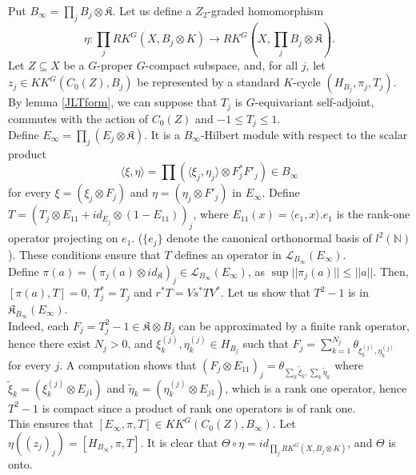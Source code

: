 \begin{dem}
Put $B_\infty = \prod_j B_j\otimes \mathfrak K $. Let us define a $Z_2$-graded homomorphism 
\[\eta :  \prod_j RK^G(X,B_j\otimes K) \rightarrow RK^G(X,\prod_j B_j\otimes \mathfrak K).\] 
Let $Z\subseteq X$ be a $G$-proper $G$-compact subspace, and, for all $j$, let $z_j\in KK^G(C_0(Z),B_j)$ be represented by a standard $K$-cycle $(H_{B_j},\pi_j ,T_j)$. By lemma \ref{JLTform}, we can suppose that $T_j$ is $G$-equivariant self-adjoint, commutes with the action of $C_0(Z)$ and $-1\leq T_j \leq 1$. \\

Define $E_\infty = \prod_j (E_j\otimes \mathfrak K)$. It is a $B_\infty$-Hilbert module with respect to the scalar product 
\[\langle \xi,\eta\rangle = \prod (\langle \xi_j,\eta_j\rangle \otimes F_j^* F'_j )\in B_\infty\] 
for every $\xi = (\xi_j\otimes F_j)$ and $\eta = (\eta_j\otimes F'_j)$ in $E_\infty$. Define $T = (T_j\otimes E_{11} + id_{E_j}\otimes (1-E_{11}))_j$, where $E_{11}(x)= \langle e_1,x\rangle. e_1$ is the rank-one operator projecting on $e_1$. ($\{e_j\}$ denote the canonical orthonormal basis of $l^2(\mathbb N)$).
These conditions ensure that $T $ defines an operator in $\mathcal L_{B_\infty}(E_\infty)$.\\

Define $\pi(a) = (\pi_j(a)\otimes id_{\mathfrak K})_j\in  \mathcal L_{B_\infty}(E_\infty)$, as $\sup ||\pi_j(a)||\leq ||a||$. Then, $[\pi(a),T]=0$, $T_j^*=T_j$ and $r^*T = Vs^*T V^*$. %
Let us show that $T^2-1$ is in $\mathfrak K_{B_\infty}(E_\infty)$.\\ 

Indeed, each $F_j = T_j^2-1\in \mathfrak K \otimes B_j$ can be approximated by a finite rank operator, hence there exist $N_j>0$, and $\xi_k^{(j)},\eta_k^{(j)}\in H_{B_j}$ such that $F_j= \sum_{k=1}^{N_j}\theta_{\xi_k^{(j)},\eta_k^{(j)}}$ for every $j$. A computation shows that $(F_j\otimes E_{11})_j = \theta_{\sum_k \tilde\xi_k,\sum_k \tilde \eta_k}$ where $\tilde \xi_k = (\xi_k^{(j)}\otimes E_{j1})$ and $\tilde \eta_k = (\eta_k^{(j)}\otimes E_{j1})$, which is a rank one operator, hence $T^2-1$ is compact since a product of rank one operators is of rank one.\\ 
This ensures that $[E_\infty,\pi,T]\in KK^G(C_0(Z),B_\infty)$. Let $\eta((z_j)_j) = [H_{B_\infty},\pi,T] $. It is clear that $\Theta\circ \eta = id_{\prod_j RK^G(X,B_j\otimes K) }$, and $\Theta $ is onto.\\


\end{dem}
